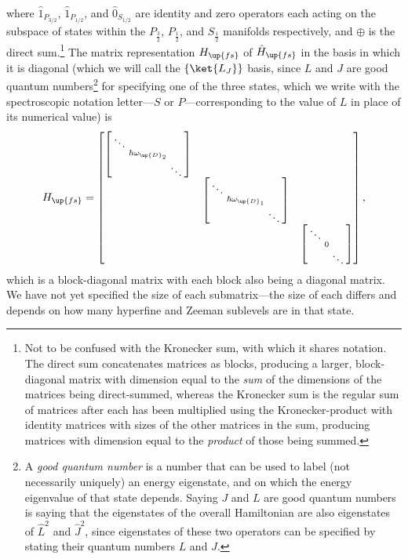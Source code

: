 where $\hat1_{P_{3/2}}$, $\hat1_{P_{1/2}}$, and $\hat 0_{S_{1/2}}$ are identity and zero operators each acting on the subspace of states within the $P_{\frac32}$, $P_{\frac12}$, and $S_{\frac12}$ manifolds respectively, and $\oplus$ is the direct sum.\footnote{Not to be confused with the Kronecker sum, with which it shares notation. The direct sum concatenates matrices as blocks, producing a larger, block-diagonal matrix with dimension equal to the \emph{sum} of the dimensions of the matrices being direct-summed, whereas the Kronecker sum is the regular sum of matrices after each has been multiplied using the Kronecker-product with identity matrices with sizes of the other matrices in the sum, producing matrices with dimension equal to the \emph{product} of those being summed.} The matrix representation $H_\up{fs}$ of $\hat H_\up{fs}$ in the basis in which it is diagonal (which we will call the $\{\ket{L_J}\}$ basis, since $L$ and $J$ are good quantum numbers\footnote{A \emph{good quantum number} is a number that can be used to label (not necessarily uniquely) an energy eigenstate, and on which the energy eigenvalue of that state depends. Saying $J$ and $L$ are good quantum numbers is saying that the eigenstates of the overall Hamiltonian are also eigenstates of $\hat L^2$ and $\hat J^2$, since eigenstates of these two operators can be specified by stating their quantum numbers $L$ and $J$.} for specifying one of the three states, which we write with the spectroscopic notation letter---$S$ or $P$---corresponding to the value of $L$ in place of its numerical value) is
\begin{align}
H_\up{fs}  = 
\left[\begin{matrix}
    \left[\begin{smallmatrix}\ddots &&\\&\hbar\omega_{\up{D}_2}&\\&&\ddots\\\end{smallmatrix} \right]\\
    & \left[\begin{smallmatrix}\ddots &&\\&\hbar\omega_{\up{D}_1}&\\&&\ddots\\\end{smallmatrix} \right]\\
    & &\left[\begin{smallmatrix}\ddots &&\\&0&\\&&\ddots\\\end{smallmatrix} \right]
\end{matrix} \right],
\end{align}
which is a block-diagonal matrix with each block also being a diagonal matrix. We have not yet specified the size of each submatrix---the size of each differs and depends on how many hyperfine and Zeeman sublevels are in that state.

